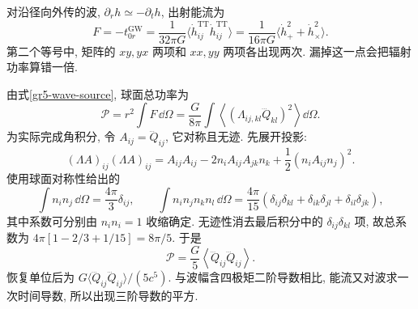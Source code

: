 对沿径向外传的波, $\partial_rh\simeq-\partial_th$, 出射能流为
\[
 F=-t^{\mathrm{GW}}_{0r}=\frac1{32\pi G}\langle\dot h^{\mathrm{TT}}_{ij}\dot h^{\mathrm{TT}}_{ij}\rangle
   =\frac1{16\pi G}\langle\dot h_+^2+\dot h_\times^2\rangle.
\]
第二个等号中, 矩阵的 $xy,yx$ 两项和 $xx,yy$ 两项各出现两次. 漏掉这一点会把辐射功率算错一倍.

由式\eqref{gr5-wave-source}, 球面总功率为
\[
 \mathcal P=r^2\int F\,\dd\Omega
 =\frac{G}{8\pi}\int\left\langle(\Lambda_{ij,kl}\dddot Q_{kl})^2\right\rangle\dd\Omega.
\]
为实际完成角积分, 令 $A_{ij}=\dddot Q_{ij}$, 它对称且无迹. 先展开投影:
\[
 (\Lambda A)_{ij}(\Lambda A)_{ij}
 =A_{ij}A_{ij}-2n_iA_{ij}A_{jk}n_k
                       +\frac12(n_iA_{ij}n_j)^2.
\]
使用球面对称性给出的
\[
 \int n_in_j\,\dd\Omega=\frac{4\pi}3\delta_{ij},\qquad
 \int n_in_jn_kn_l\,\dd\Omega
 =\frac{4\pi}{15}(\delta_{ij}\delta_{kl}+\delta_{ik}\delta_{jl}+\delta_{il}\delta_{jk}),
\]
其中系数可分别由 $n_in_i=1$ 收缩确定. 无迹性消去最后积分中的 $\delta_{ij}\delta_{kl}$ 项, 故总系数为 $4\pi[1-2/3+1/15]=8\pi/5$. 于是
\begin{equation}\label{gr5-power}
 \mathcal P=\frac G5\left\langle\dddot Q_{ij}\dddot Q_{ij}\right\rangle.
\end{equation}
恢复单位后为 $G\langle\dddot Q_{ij}\dddot Q_{ij}\rangle/(5c^5)$. 与波幅含四极矩二阶导数相比, 能流又对波求一次时间导数, 所以出现三阶导数的平方.


